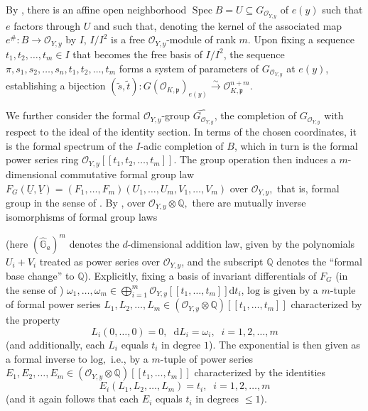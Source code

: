 \documentclass[11pt,oneside]{amsart}
\theoremstyle{plain}
\theoremstyle{definition}
\DeclareMathOperator{\spec}{Spec} \DeclareMathOperator{\sgn}{sign}
\def\Q{\mathbb{Q}}
\def\oh{\mathcal{O}}
\begin{document}
By \cite[05D9]{stacks}, there is an affine open neighborhood $\spec{B}=U \subseteq G_{\oh_{Y, y}}$ of $e(y)$ such that $e$ factors through $U$ and such that, denoting the kernel of the associated map $e^{\#}: B \rightarrow \oh_{Y, y}$ by $I$, $I/I^2$ is a free $\oh_{Y, y}$-module of rank $m$. Upon fixing a sequence $t_1, t_2, \dots, t_m \in I$ that becomes the free basis of $I/I^2$, the sequence $\pi, s_1, s_2, \dots, s_n, t_1, t_2, \dots, t_m$ forms a system of parameters of $G_{\oh_{Y, y}}$ at $e(y)$, establishing a bijection $(\tilde{s}, \tilde{t}): G(\oh_{K, \mathfrak{p}})_{e(y)} \stackrel{\sim}{\rightarrow} \oh_{K, \mathfrak{p}}^{n+m}.$ 

We further consider the formal $\oh_{Y, y}$-group $\widehat{G_{\oh_{Y, y}}}$, the completion of $G_{\oh_{Y, y}}$ with respect to the ideal of the identity section. In terms of the chosen coordinates, it is the formal spectrum of the $I$-adic completion of $B$, which in turn is the formal power series ring $\oh_{Y, y}[[t_1, t_2, \dots, t_m]]$. The group operation then induces a $m$-dimensional commutative formal group law $F_G(\underline{U}, \underline{V})=(F_1, \dots, F_m)(U_1, \dots, U_m, V_1, \dots, V_m)$ over $\oh_{Y, y},$ that is, formal group in the sense of \cite{honda}.  By \cite[Theorem 1]{honda}, over $\oh_{Y, y}\otimes \Q,$ there are mutually inverse isomorphisms of formal group laws 
\begin{center}
\end{center}
(here $(\widehat{\mathbb{G}}_a)^m$ denotes the $d$-dimensional addition law, given by the polynomials $U_i+V_i$ treated as power series over $\oh_{Y, y}$, and the subscript $\Q$ denotes the ``formal base change'' to $\Q$). Explicitly, fixing a basis of invariant differentials of $F_G$ (in the sense of \cite[Proposition 1.1]{honda}) $\omega_1, \dots, \omega_m \in \bigoplus_{i=1}^m \oh_{Y, y}[[t_1, \dots, t_m]] \mathrm{d}t_i$, $\mathrm{log}$ is given by a $m$-tuple of formal power series $L_1, L_2, \dots, L_m \in (\oh_{Y, y}\otimes\Q)[[t_1, \dots, t_m]]$ characterized by the property
\begin{equation}\label{logdef}
L_i(0, \dots, 0)=0,\;\; \mathrm{d} L_i=\omega_i,\;\;i=1, 2, \dots, m
\end{equation}
(and additionally, each $L_i$ equals $t_i$ in degree $1$).
The exponential is then given as a formal inverse to $\mathrm{log},$ i.e., by a $m$-tuple of power series $E_1, E_2, \dots, E_m \in (\oh_{Y, y}\otimes\Q)[[t_1, \dots, t_m]]$ characterized by the identities
\begin{equation}\label{expdef}
E_i(L_1, L_2, \dots, L_m)=t_i,\;\; i=1, 2, \dots, m
\end{equation}
(and it again follows that each $E_i$ equals $t_i$ in degrees $\leq 1$).
\end{document}
